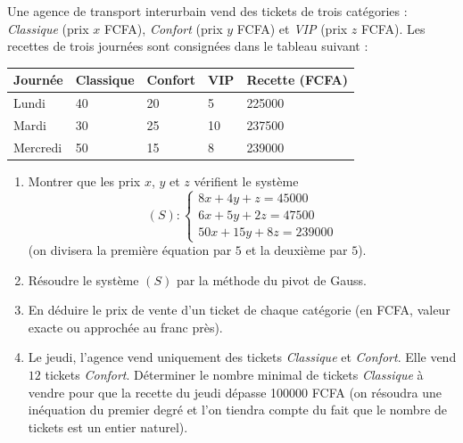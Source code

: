 \documentclass[11pt]{article}
\begin{document}
\begin{exercice}
Une agence de transport interurbain vend des tickets de trois catégories : \emph{Classique} (prix $x$ FCFA), \emph{Confort} (prix $y$ FCFA) et \emph{VIP} (prix $z$ FCFA). Les recettes de trois journées sont consignées dans le tableau suivant :

\begin{center}
\begin{tabularx}{\linewidth}{|l|X|X|X|X|}
\hline
\rowcolor{popblueL} Journée & Classique & Confort & VIP & Recette (FCFA) \\
\hline
Lundi & 40 & 20 & 5 & \num{225000} \\
\hline
Mardi & 30 & 25 & 10 & \num{237500} \\
\hline
Mercredi & 50 & 15 & 8 & \num{239000} \\
\hline
\end{tabularx}
\end{center}

\begin{enumerate}
\item Montrer que les prix $x$, $y$ et $z$ vérifient le système
\[ (S) : \begin{cases} 8x+4y+z=\num{45000}\\ 6x+5y+2z=\num{47500}\\ 50x+15y+8z=\num{239000} \end{cases} \]
(on divisera la première équation par $5$ et la deuxième par $5$).
\item Résoudre le système $(S)$ par la méthode du pivot de Gauss.
\item En déduire le prix de vente d'un ticket de chaque catégorie (en FCFA, valeur exacte ou approchée au franc près).
\item Le jeudi, l'agence vend uniquement des tickets \emph{Classique} et \emph{Confort}. Elle vend $12$ tickets \emph{Confort}. Déterminer le nombre minimal de tickets \emph{Classique} à vendre pour que la recette du jeudi dépasse \num{100000} FCFA (on résoudra une inéquation du premier degré et l'on tiendra compte du fait que le nombre de tickets est un entier naturel).
\end{enumerate}
\end{exercice}
\end{document}
